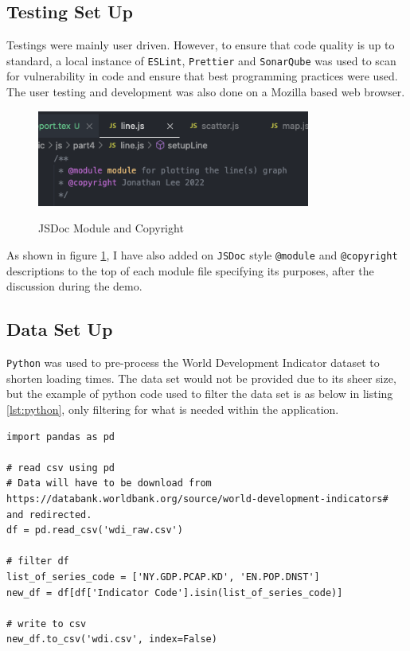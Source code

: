 \documentclass{scrreprt}
\begin{document}
\subsection{Testing Set Up}
Testings were mainly user driven. However, to ensure that code quality is up to standard, a local instance of \verb|ESLint|, \verb|Prettier| and \verb|SonarQube| was used to scan for vulnerability in code and ensure that best programming practices were used. The user testing and development was also done on a Mozilla based web browser.
\begin{figure}[H]
    \centering
    \includegraphics[width = 0.8\textwidth]{images/testing.png}
    \label{fig:Testing}
    \caption{JSDoc Module and Copyright}
\end{figure}

As shown in figure \ref{fig:Testing}, I have also added on \verb|JSDoc| style \verb|@module| and \verb|@copyright| descriptions to the top of each module file specifying its purposes, after the discussion during the demo. 

\subsection{Data Set Up}
\verb|Python| was used to pre-process the World Development Indicator dataset to shorten loading times. The data set would not be provided due to its sheer size, but the example of python code used to filter the data set is as below in listing \ref{lst:python}, only filtering for what is needed within the application.
\begin{lstlisting}[label = {lst:python}, caption = {Python Pre-Processing}]
import pandas as pd

# read csv using pd
# Data will have to be download from https://databank.worldbank.org/source/world-development-indicators# and redirected. 
df = pd.read_csv('wdi_raw.csv')

# filter df
list_of_series_code = ['NY.GDP.PCAP.KD', 'EN.POP.DNST']
new_df = df[df['Indicator Code'].isin(list_of_series_code)]

# write to csv
new_df.to_csv('wdi.csv', index=False)
\end{lstlisting}
\end{document}
